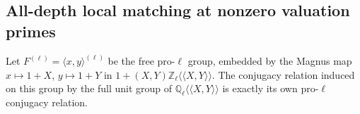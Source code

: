 \subsection{All-depth local matching at nonzero valuation primes}
\label{sec:ghost-local-rigidity}

\begin{lemma}
\label{lem:ghost-magnus-conjugacy}
Let \(F^{(\ell)}=\langle x,y\rangle^{(\ell)}\) be the
free pro-\(\ell\) group, embedded by the Magnus map
\(x\mapsto1+X\), \(y\mapsto1+Y\) in
\(1+(X,Y)\mathbb Z_\ell\langle\!\langle X,Y\rangle\!\rangle\).
The conjugacy relation induced on this group by the full
unit group of
\(\mathbb Q_\ell\langle\!\langle X,Y\rangle\!\rangle\)
is exactly its own pro-\(\ell\) conjugacy relation.
\end{lemma}
